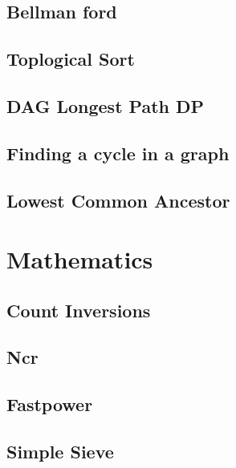 \subsection{Bellman ford}
\raggedbottom
\hrulefill
\subsection{Toplogical Sort}
\raggedbottom
\hrulefill
\subsection{DAG Longest Path DP}
\raggedbottom
\hrulefill
\subsection{Finding a cycle in a graph}
\raggedbottom
\hrulefill
\subsection{Lowest Common Ancestor}
\raggedbottom
\hrulefill


\section{Mathematics}
\subsection{Count Inversions}
\raggedbottom
\hrulefill
\subsection{Ncr}
\raggedbottom
\hrulefill
\subsection{Fastpower}
\raggedbottom
\hrulefill
\subsection{Simple Sieve}
\raggedbottom
\hrulefill
